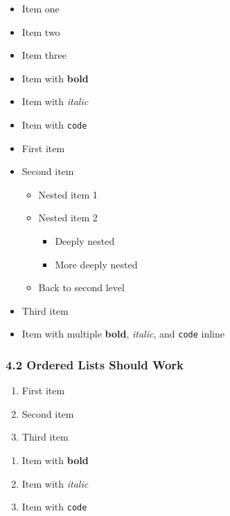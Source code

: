 \documentclass{article}
\begin{document}
\begin{itemize}
\item  Item one
\item  Item two
\item  Item three
\end{itemize}

\begin{itemize}
\item  Item with \textbf{bold}
\item  Item with \emph{italic}
\item  Item with \texttt{code}
\end{itemize}

\begin{itemize}
\item  First item
\item  Second item
\begin{itemize}
\item  Nested item 1
\item  Nested item 2
\begin{itemize}
\item  Deeply nested
\item  More deeply nested
\end{itemize}


\item  Back to second level
\end{itemize}


\item  Third item
\end{itemize}

\begin{itemize}
\item  Item with multiple \textbf{bold}, \emph{italic}, and \texttt{code} inline
\end{itemize}

\subsubsection{ 4.2 Ordered Lists Should Work}

\begin{enumerate}
\item  First item
\item  Second item
\item  Third item
\end{enumerate}

\begin{enumerate}
\item  Item with \textbf{bold}
\item  Item with \emph{italic}
\item  Item with \texttt{code}
\end{enumerate}
\end{document}

